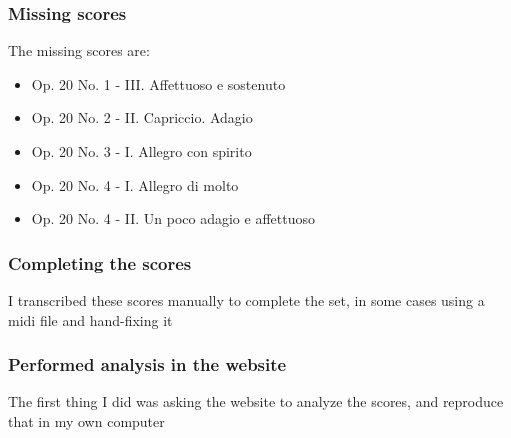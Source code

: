     \subsubsection{Missing scores}
    The missing scores are:
    \begin{itemize}
      \item Op. 20 No. 1 - III. Affettuoso e sostenuto
      \item Op. 20 No. 2 - II. Capriccio. Adagio
      \item Op. 20 No. 3 - I. Allegro con spirito
      \item Op. 20 No. 4 - I. Allegro di molto
      \item Op. 20 No. 4 - II. Un poco adagio e affettuoso
    \end{itemize}
    \subsubsection{Completing the scores}
    I transcribed these scores manually to complete the set, in some cases using a midi file and hand-fixing it
    \subsubsection{Performed analysis in the website}
    The first thing I did was asking the website to analyze the scores, and reproduce that in my own computer


\newpage
